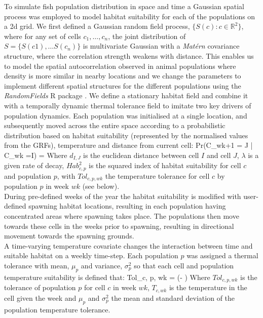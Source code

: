 \documentclass[review]{elsarticle}
\let\oldequation\equation
\let\oldendequation\endequation
\renewenvironment{equation}
 {\linenomathNonumbers\oldequation}
 {\oldendequation\endlinenomath}
\begin{document}
To simulate fish population distribution in space and time a Gaussian spatial
process was employed to model habitat suitability for each of the populations
on a 2d grid.  We first defined a Gaussian random field process, $\{S(c) : c \in
\mathbb{R}^2\}$, where for any set of cells $c_{1}, \dots, c_{n}$, the joint
distribution of $S = \{S(c1),\dots S(c_{n})\}$ is multivariate Gaussian with a
\textit{Matérn} covariance structure, where the correlation strength weakens
with distance. This enables us to model the spatial autocorrelation observed in
animal populations where density is more similar in nearby locations
\citep{Tobler1970, F.Dormann2007, Poos2007} and we change the parameters to
implement different spatial structures for the different populations using the
\textit{RandomFields} R package \citep{Schlater2015}. We define a stationary
habitat field and combine it with a temporally dynamic thermal tolerance field to
imitate two key drivers of population dynamics. Each population was initialised
at a single location, and subsequently moved across the entire space according
to a probabilistic distribution based on habitat suitability (represented by
the normalised values
from the GRFs), temperature and distance from current cell: 
\begin{equation}
	Pr(C_{wk+1} = J | C_{wk} =I) = 
\end{equation}
Where $d_{I,J}$ is the euclidean distance between cell $I$ and cell $J$,
$\lambda$ is a given rate of decay, $Hab_{c,p}^2$ is the squared index of
habitat suitability for cell $c$ and population $p$, with $Tol_{c,p,wk}$ the
temperature tolerance for cell $c$ by population $p$ in week $wk$ (see
below). \\

During pre-defined weeks of the year the habitat suitability is modified with
user-defined spawning habitat locations, resulting in each population having
concentrated areas where spawning takes place. The populations then move
towards these cells in the weeks prior to spawning, resulting in directional
movement towards the spawning grounds. \\

A time-varying temperature covariate changes the interaction between time and
suitable habitat on a weekly time-step. Each population $p$ was assigned a
thermal tolerance with mean, $\mu_{p}$ and variance, $\sigma^2_{p}$ so that
each cell and population temperature suitability is defined that:
\begin{equation}
	Tol_{c, p, wk} =  \cdot \exp(-
		 )	
\end{equation}
Where $Tol_{c, p, wk}$ is the tolerance of population $p$ for cell $c$ in week
$wk$, $T_{c, wk}$ is the temperature in the cell given the week and $\mu_{p}$
and $\sigma^2_{p}$ the mean and standard deviation of the population
temperature tolerance. \\
\end{document}
